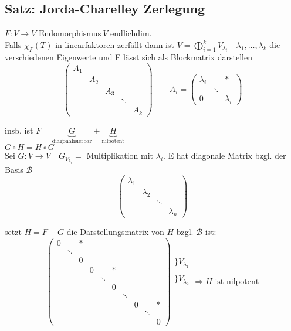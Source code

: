\documentclass[titlepage,12pt,a4paper,ngerman]{report}
\newcommand{\tx}[1]{\textrm{#1}}
\newcommand{\ub}[1]{\underbrace{#1}}
\newcommand{\enph}{F: V \to V \textrm{ Endomorphismus}}
\begin{document}
\subsection{Satz: Jorda-Charelley Zerlegung}
$\enph \ V$ endlichdim.\\
Falls $ \chi_F(T) $ in linearfaktoren zerfällt dann ist $ V = \bigoplus\limits_{i=1}^{k} V_{\lambda_i} \quad \lambda_1,\dots, \lambda_k$ die verschiedenen Eigenwerte und F lässt sich als Blockmatrix darstellen
$$\begin{pmatrix}
A_1 \\
& A_2 \\
& & A_3 \\
& & & \ddots \\
& & & & A_k
\end{pmatrix} \qquad A_i = \begin{pmatrix}
\lambda_i & & *\\
& \ddots \\
0 & & \lambda_i
\end{pmatrix}$$

insb. ist $ F = \ub{G}_{\tx{diagonalisierbar}}+\ub{H}_{\tx{nilpotent}} $\\
$G \circ H = H \circ G $\\
Sei $ G: V\to V \quad G _{V_{\lambda_i}} =$ Multiplikation mit $ \lambda_i $. E hat diagonale Matrix bzgl. der Basis $ \mathcal{B} $ 
$$\begin{pmatrix}
\lambda_1 \\
& \lambda_2\\
& & \ddots \\
& & & \lambda_n
\end{pmatrix}$$

setzt $ H = F - G $ die Darstellungsmatrix von $ H $ bzgl. $ \mathcal{B} $ ist:
$$\begin{pmatrix}
0 & & *\\
& \ddots \\
& & 0\\
& & & 0 & & *\\
& & & & \ddots\\
& & & & & 0\\
& & & & & & \ddots\\
& & & & & & & 0 & & *\\
& & & & & & & & \ddots\\
& & & & & & & & &0
\end{pmatrix} \begin{matrix}
\\
\bigg\} V_{\lambda_1}\\
\\
\bigg\} V_{\lambda_2}\\
\\
\\
\\
\\
\\
\\
\end{matrix} \Rightarrow H \tx{ ist nilpotent}$$
\end{document}
